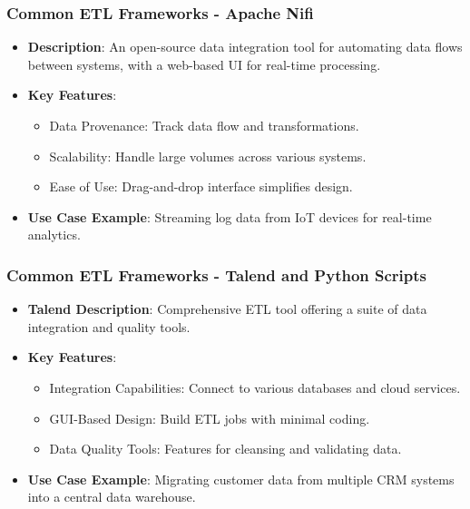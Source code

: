 \documentclass{beamer}
\begin{document}
\begin{frame}[fragile]
    \frametitle{Common ETL Frameworks - Apache Nifi}
    \begin{itemize}
        \item \textbf{Description}: An open-source data integration tool for automating data flows between systems, with a web-based UI for real-time processing.
        \item \textbf{Key Features}:
        \begin{itemize}
            \item Data Provenance: Track data flow and transformations.
            \item Scalability: Handle large volumes across various systems.
            \item Ease of Use: Drag-and-drop interface simplifies design.
        \end{itemize}
        \item \textbf{Use Case Example}: Streaming log data from IoT devices for real-time analytics.
    \end{itemize}
\end{frame}

\begin{frame}[fragile]
    \frametitle{Common ETL Frameworks - Talend and Python Scripts}
    \begin{itemize}
        \item \textbf{Talend Description}: Comprehensive ETL tool offering a suite of data integration and quality tools.
        \item \textbf{Key Features}:
        \begin{itemize}
            \item Integration Capabilities: Connect to various databases and cloud services.
            \item GUI-Based Design: Build ETL jobs with minimal coding.
            \item Data Quality Tools: Features for cleansing and validating data.
        \end{itemize}
        \item \textbf{Use Case Example}: Migrating customer data from multiple CRM systems into a central data warehouse.
    \end{itemize}
\end{frame}
\end{document}
